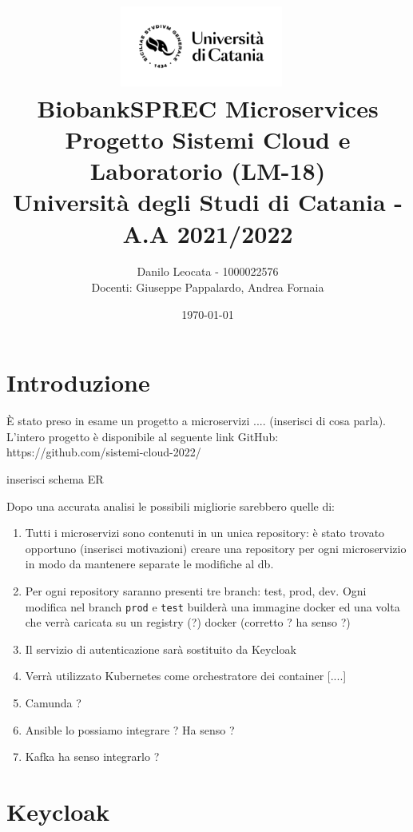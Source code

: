 \documentclass[11pt]{article}
\title{ %
\includegraphics[width=0.4\textwidth]{UniCT-Logo-Nero}~\\
BiobankSPREC Microservices \\ 
\large Progetto Sistemi Cloud e Laboratorio (LM-18) \\ Università degli Studi di Catania - A.A 2021/2022 \\
}
\author{ Danilo Leocata - 1000022576 \\ Docenti: Giuseppe Pappalardo, Andrea Fornaia}
\date{\today}
\begin{document}
\maketitle	
\pagebreak


\section{Introduzione}

È stato preso in esame un progetto a microservizi .... (inserisci di cosa parla). L'intero progetto è disponibile al seguente link GitHub:
https://github.com/sistemi-cloud-2022/

\begin{center}
    inserisci schema ER
\end{center}

Dopo una accurata analisi le possibili migliorie sarebbero quelle di:

\begin{enumerate}
    \item {
        Tutti i microservizi sono contenuti in un unica repository: è stato trovato opportuno (inserisci motivazioni) creare una repository per ogni microservizio
        in modo da mantenere separate le modifiche al db.
    }

    \item {
        Per ogni repository saranno presenti tre branch: test, prod, dev. Ogni modifica nel branch \texttt{prod} e \texttt{test} builderà una immagine docker ed una volta
        che verrà caricata su un registry (?) docker (corretto ? ha senso ?)
    }

    \item {
        Il servizio di autenticazione sarà sostituito da Keycloak
    }

    \item {
        Verrà utilizzato Kubernetes come orchestratore dei container [....]
    }
    
    \item {
        Camunda ?
    }

    \item {
        Ansible lo possiamo integrare ? Ha senso ? 
    }

    \item {
        Kafka ha senso integrarlo ? 
    }
    

\end{enumerate}


\section{Keycloak}
\end{document}
